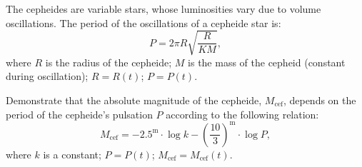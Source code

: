 The cepheides are variable stars, whose luminosities vary due to volume
oscillations. The period of the oscillations of a cepheide star is:
\[ P = 2\pi R \sqrt{\frac{R}{KM}}, \]
where $R$ is the radius of the cepheide; $M$ is the mass of the cepheid
(constant during oscillation); $R = R(t)$; $P = P(t)$.

Demonstrate that the absolute magnitude of the cepheide, $M_{\mathrm{cef}}$,
depends on the period of the cepheide's pulsation $P$ according to the
following relation:
\[ M_{\mathrm{cef}} = -2.5^{\mathrm{m}} \cdot \log k
   - \left(\frac{10}{3}\right)^{\mathrm{m}} \cdot \log P, \]
where $k$ is a constant; $P = P(t)$;
$M_{\mathrm{cef}} = M_{\mathrm{cef}}(t)$.
